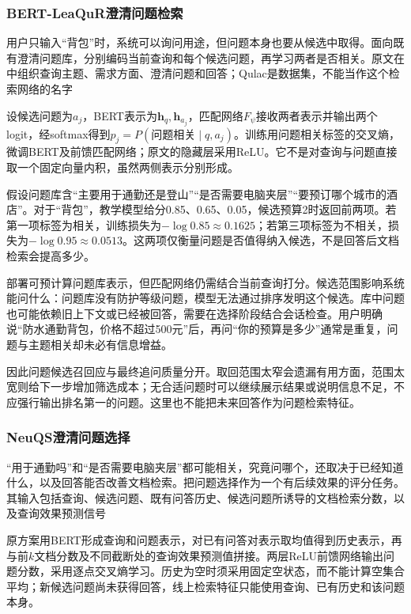 \Needspace{100mm}
\subsubsection{BERT-LeaQuR澄清问题检索}
\label{sec:rs-search-leaqur}

用户只输入“背包”时，系统可以询问用途，但问题本身也要从候选中取得。面向既有澄清问题库，分别编码当前查询和每个候选问题，再学习两者是否相关。原文在中组织查询主题、需求方面、澄清问题和回答；Qulac是数据集，不能当作这个检索网络的名字

设候选问题为$a_j$，BERT表示为$\bm h_q,\bm h_{a_j}$，匹配网络$F_\psi$接收两者表示并输出两个logit，经softmax得到$p_j=P(\text{问题相关}\mid q,a_j)$。训练用问题相关标签的交叉熵，微调BERT及前馈匹配网络；原文的隐藏层采用ReLU。它不是对查询与问题直接取一个固定向量内积，虽然两侧表示分别形成。

假设问题库含“主要用于通勤还是登山”“是否需要电脑夹层”“要预订哪个城市的酒店”。对于“背包”，教学模型给分0.85、0.65、0.05，候选预算2时返回前两项。若第一项标签为相关，训练损失为$-\log0.85\approx0.1625$；若第三项标签为不相关，损失为$-\log0.95\approx0.0513$。这两项仅衡量问题是否值得纳入候选，不是回答后文档检索会提高多少。

部署可预计算问题库表示，但匹配网络仍需结合当前查询打分。候选范围影响系统能问什么：问题库没有防护等级问题，模型无法通过排序发明这个候选。库中问题也可能依赖旧上下文或已经被回答，需要在选择阶段结合会话检查。用户明确说“防水通勤背包，价格不超过500元”后，再问“你的预算是多少”通常是重复，问题与主题相关却未必有信息增益。

因此问题候选召回应与最终追问质量分开。取回范围太窄会遗漏有用方面，范围太宽则给下一步增加筛选成本；无合适问题时可以继续展示结果或说明信息不足，不应强行输出排名第一的问题。这里也不能把未来回答作为问题检索特征。

\Needspace{100mm}
\subsubsection{NeuQS澄清问题选择}
\label{sec:rs-search-neuqs}

“用于通勤吗”和“是否需要电脑夹层”都可能相关，究竟问哪个，还取决于已经知道什么，以及回答能否改善文档检索。把问题选择作为一个有后续效果的评分任务。其输入包括查询、候选问题、既有问答历史、候选问题所诱导的文档检索分数，以及查询效果预测信号

原方案用BERT形成查询和问题表示，对已有问答对表示取均值得到历史表示，再与前$k$文档分数及不同截断处的查询效果预测值拼接。两层ReLU前馈网络输出问题分数，采用逐点交叉熵学习。历史为空时须采用固定空状态，而不能计算空集合平均；新候选问题尚未获得回答，线上检索特征只能使用查询、已有历史和该问题本身。

